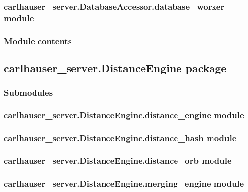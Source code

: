 \documentclass[letterpaper,10pt,english]{sphinxmanual}
\begin{document}
\subsubsection{carlhauser\_server.DatabaseAccessor.database\_worker module}
\label{\detokenize{carlhauser_server.DatabaseAccessor:carlhauser-server-databaseaccessor-database-worker-module}}

\subsubsection{Module contents}
\label{\detokenize{carlhauser_server.DatabaseAccessor:module-contents}}

\subsection{carlhauser\_server.DistanceEngine package}
\label{\detokenize{carlhauser_server.DistanceEngine:carlhauser-server-distanceengine-package}}\label{\detokenize{carlhauser_server.DistanceEngine::doc}}

\subsubsection{Submodules}
\label{\detokenize{carlhauser_server.DistanceEngine:submodules}}

\subsubsection{carlhauser\_server.DistanceEngine.distance\_engine module}
\label{\detokenize{carlhauser_server.DistanceEngine:carlhauser-server-distanceengine-distance-engine-module}}

\subsubsection{carlhauser\_server.DistanceEngine.distance\_hash module}
\label{\detokenize{carlhauser_server.DistanceEngine:carlhauser-server-distanceengine-distance-hash-module}}

\subsubsection{carlhauser\_server.DistanceEngine.distance\_orb module}
\label{\detokenize{carlhauser_server.DistanceEngine:carlhauser-server-distanceengine-distance-orb-module}}

\subsubsection{carlhauser\_server.DistanceEngine.merging\_engine module}
\label{\detokenize{carlhauser_server.DistanceEngine:carlhauser-server-distanceengine-merging-engine-module}}
\end{document}
